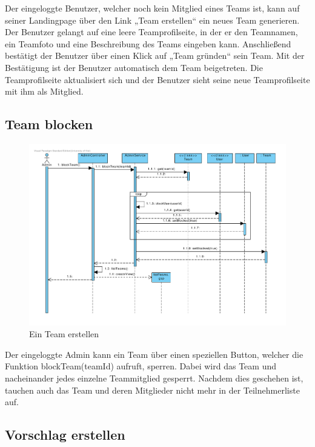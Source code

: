 Der eingeloggte Benutzer, welcher noch kein Mitglied eines Teams ist,
kann auf seiner Landingpage über den Link „Team erstellen“ ein neues
Team generieren. Der Benutzer gelangt auf eine leere Teamprofilseite,
in der er den Teamnamen, ein Teamfoto und eine Beschreibung des Teams
eingeben kann. Anschließend bestätigt der Benutzer über einen Klick
auf „Team gründen“ sein Team. Mit der Bestätigung ist der Benutzer
automatisch dem Team beigetreten. Die Teamprofilseite aktualisiert
sich und der Benutzer sieht seine neue Teamprofilseite mit ihm als
Mitglied.\\

\subsection{Team blocken}

\begin{figure}[H]
  \centering
  \includegraphics[width=\textwidth, clip]{gfx/team_blockieren}
  \caption{Ein Team erstellen}
\end{figure}

Der eingeloggte Admin kann ein Team über einen speziellen Button, welcher die Funktion blockTeam(teamId) aufruft, sperren. Dabei wird das Team und nacheinander jedes einzelne Teammitglied gesperrt. Nachdem dies geschehen ist, tauchen auch das Team und deren Mitglieder nicht mehr in der Teilnehmerliste auf.\\

\subsection{Vorschlag erstellen}

